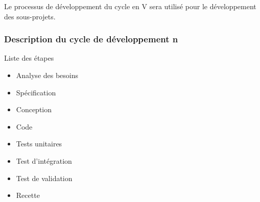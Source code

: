             Le processus de développement du cycle en V sera utilisé pour le
            développement des sous-projets.

        \subsubsection{Description du cycle de développement n}

            \par{Liste des étapes}
                \begin{itemize}
                    \item Analyse des besoins
                    \item Spécification
                    \item Conception
                    \item Code
                    \item Tests unitaires
                    \item Test d'intégration
                    \item Test de validation
                    \item Recette
                \end{itemize}
            

\pagebreak
